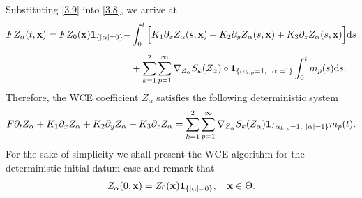 \documentclass[preprint,12pt]{article}
\numberwithin{figure}{section}
\numberwithin{table}{section}
\numberwithin{equation}{section}
\begin{document}
Substituting \eqref{3.9} into \eqref{3.8}, we arrive at
\begin{equation*}
	\begin{split}
		FZ_{\alpha}(t,{\bf x})=FZ_0({\bf x}){\bf 1}_{\{|\alpha|=0\}}-&\int_{0}^{t}\Big[K_1\partial_xZ_{\alpha}(s,{\bf x})+K_2\partial_yZ_{\alpha}(s,{\bf x})+K_3\partial_zZ_{\alpha}(s,{\bf x})\Big]{\rm d}s\\[1.5mm]
		&+\sum_{k=1}^2\sum_{p=1}^{\infty}\nabla_{Z_{\alpha}} S_{k}(Z_{\alpha})\circ{\bf 1}_{\{\alpha_{k,p}=1,~|\alpha|=1\}}\int_{0}^{t}m_p(s){\rm d}s.
	\end{split}
\end{equation*}
Therefore, the WCE coefficient $Z_\alpha$ satisfies the following deterministic system
\begin{equation}\label{3.11}
F\partial_tZ_{\alpha}+K_1\partial_xZ_{\alpha}+K_2\partial_yZ_{\alpha}+K_3\partial_zZ_{\alpha}=\sum_{k=1}^2\sum_{p=1}^{\infty}\nabla_{Z_{\alpha}} S_{k}(Z_{\alpha}){\bf 1}_{\{\alpha_{k, p}=1,~|\alpha|=1\}}m_p(t).
\end{equation}
For the sake of simplicity we shall present the WCE algorithm for the deterministic initial datum case and remark that
\begin{equation}\label{3.5}
Z_{\alpha}(0,{\bf x})=Z_{0}({\bf x}){\bf 1}_{\{|\alpha|=0\}},\quad {\bf x}\in\Theta.
\end{equation}
\end{document}
